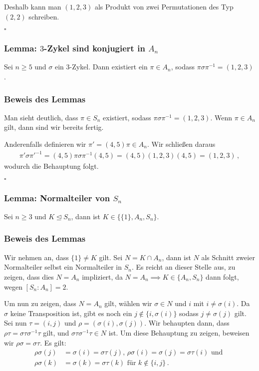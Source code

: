 \documentclass[12pt, german]{article}
\newcommand{\bewiesen}{
	
	\begin{flushright}
		$\square$  \\
\end{flushright}}
\begin{document}
	Deshalb kann man $(1,2,3)$ als Produkt von zwei Permutationen des Typ $(2,2)$ schreiben.
	\bewiesen
	
	\subsubsection{Lemma: $3$-Zykel sind konjugiert in $A_n$}
	Sei $n \geq 5$ und $\sigma$ ein $3$-Zykel. Dann existiert ein $\pi \in A_n$, sodass $\pi\sigma\pi^{-1} = (1,2,3)$.
	
	\subsubsection{Beweis des Lemmas}
	Man sieht deutlich, dass $\pi \in S_n$ existiert, sodass $\pi\sigma\pi^{-1} = (1,2,3)$. 
	Wenn $\pi \in A_n$ gilt, dann sind wir bereits fertig. 
	\newline
	
	Anderenfalls definieren wir $\pi' = (4,5)\pi \in A_n$.  Wir schlie\ss en daraus 
	\begin{align*}
		\pi'\sigma\pi'^{-1} = (4,5)\pi\sigma\pi^{-1}(4,5) = (4,5)(1,2,3)(4,5) = (1,2,3)\,,
	\end{align*}
	wodurch die Behauptung folgt.
	\bewiesen
	
	\subsubsection{Lemma: Normalteiler von $S_n$}
	Sei $n \geq 3$ und $K \trianglelefteq S_n$, dann ist $K \in \{ \{1\}, A_n, S_n\}$.
	
	\subsubsection{Beweis des Lemmas}
	Wir nehmen an, dass $\{1\} \not = K$ gilt. Sei $N= K \cap A_n$, dann ist $N$ als Schnitt zweier Normalteiler selbst ein Normalteiler in $S_n$. Es reicht an dieser Stelle aus, zu zeigen, dass dies $N=A_n$ impliziert, da $N = A_n \implies K \in \{ A_n, S_n\}$ dann folgt, wegen $[S_n : A_n] = 2$.
	\newline
	
	Um nun zu zeigen, dass $N=A_n$ gilt, wählen wir $\sigma \in N$ und $i$ mit $i \not = \sigma(i)$. Da $\sigma$ keine Transposition ist, gibt es noch ein $j \notin \{i, \sigma(i)\}$ sodass $j \not=\sigma(j)$ gilt. \\
	
	Sei nun $\tau = (i, j)$ und $\rho = (\sigma(i), \sigma(j))$. 
	Wir behaupten dann, dass $\rho\tau = \sigma\tau\sigma^{-1}\tau$ gilt, und $\sigma\tau\sigma^{-1}\tau \in N$ ist. Um diese Behauptung zu zeigen, beweisen wir $\rho\sigma = \sigma\tau$. 
	Es gilt:
	\begin{align*}
		\rho\sigma(j) &= \sigma(i) = \sigma\tau(j) \text{, } \rho\sigma(i) = \sigma(j) = \sigma\tau(i) \text{ und }\\
		\rho\sigma(k) &= \sigma(k) = \sigma\tau(k) \text{ für } k \not \in \{i, j\}\, .
	\end{align*}
	
\end{document}
